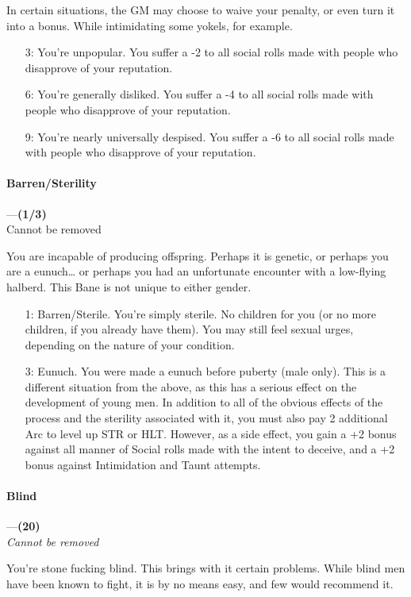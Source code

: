\documentclass[oneside,11pt,english]{book}
\begin{document}
In certain situations, the GM may choose to waive your penalty, or even turn it into a bonus. While 
intimidating some yokels, for example. 

\begin{itemize}
	\item [3:] You're unpopular. You suffer a -2 to all social rolls made with people who disapprove of your 
	reputation. 
	\item [6:] You're generally disliked. You suffer a -4 to all social rolls made with people who disapprove of your 
	reputation. 
	\item [9:] You're nearly universally despised. You suffer a -6 to all social rolls made with people who disapprove 
of your reputation. 
\end{itemize}
\paragraph{\label{bane:Barren/Sterility}Barren/Sterility}---\quad\textbf{(1/3)}\\
{Cannot be removed}\par
You are incapable of producing offspring. Perhaps it is genetic, or perhaps you are a eunuch… or perhaps 
you had an unfortunate encounter with a low-flying halberd. This Bane is not unique to either gender. 
\begin{itemize}
\item [1:] Barren/Sterile. You’re simply sterile. No children for you (or no more children, if you already have them). You may still feel sexual urges, depending on the nature of your condition.
\item [3:] Eunuch. You were made a eunuch before puberty (male only). This is a different situation from the above, as this has a serious effect on the development of young men. In addition to all of the obvious effects of the process and the sterility associated with it, you must also pay 2 additional Arc to level up STR or HLT. However, as a side effect, you gain a +2 bonus against all manner of Social rolls made with the intent to deceive, and a +2 bonus against Intimidation and Taunt attempts.
\end{itemize}
\paragraph{\label{bane:Blind}Blind}---\quad\textbf{(20)}\\
\emph{Cannot be removed}\par
You're stone fucking blind. This brings with it certain problems. While blind men have been known to fight, it is by no means easy, and few would recommend it. 
\end{document}
